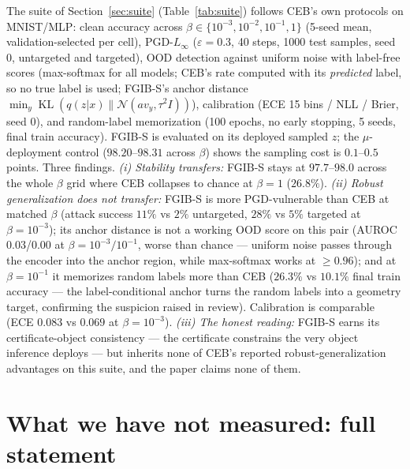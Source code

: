 \documentclass{article} %
\newcommand{\KLd}{\operatorname{KL}}
\newcommand{\Ncal}{\mathcal{N}}
\begin{document}
The suite of Section~\ref{sec:suite} (Table~\ref{tab:suite}) follows CEB's own
protocols on MNIST/MLP: clean accuracy across
$\beta\in\{10^{-3},10^{-2},10^{-1},1\}$ (5-seed mean, validation-selected per cell),
PGD-$L_\infty$ ($\varepsilon{=}0.3$, 40 steps, 1000 test samples, seed 0, untargeted
and targeted), OOD detection against uniform noise with label-free scores
(max-softmax for all models; CEB's rate computed with its \emph{predicted} label, so
no true label is used; FGIB-S's anchor distance
$\min_y \KLd(q(z|x)\|\Ncal(a v_y,\tau^2 I))$), calibration (ECE 15 bins / NLL / Brier,
seed 0), and random-label memorization (100 epochs, no early stopping, 5 seeds, final
train accuracy). FGIB-S is evaluated on its deployed sampled $z$; the
$\mu$-deployment control ($98.20$--$98.31$ across $\beta$) shows the sampling cost is
$0.1$--$0.5$ points. Three findings. \emph{(i) Stability transfers:} FGIB-S stays at
$97.7$--$98.0$ across the whole $\beta$ grid where CEB collapses to chance at
$\beta{=}1$ ($26.8\%$). \emph{(ii) Robust generalization does not transfer:} FGIB-S
is more PGD-vulnerable than CEB at matched $\beta$ (attack success $11\%$ vs $2\%$
untargeted, $28\%$ vs $5\%$ targeted at $\beta{=}10^{-3}$); its anchor distance is
not a working OOD score on this pair (AUROC $0.03$/$0.00$ at $\beta{=}10^{-3}/10^{-1}$,
worse than chance --- uniform noise passes through the encoder into the anchor region,
while max-softmax works at $\ge0.96$); and at $\beta{=}10^{-1}$ it memorizes random
labels more than CEB ($26.3\%$ vs $10.1\%$ final train accuracy --- the
label-conditional anchor turns the random labels into a geometry target, confirming
the suspicion raised in review). Calibration is comparable (ECE $0.083$ vs $0.069$ at
$\beta{=}10^{-3}$). \emph{(iii) The honest reading:} FGIB-S earns its
certificate-object consistency --- the certificate constrains the very object
inference deploys --- but inherits none of CEB's reported robust-generalization
advantages on this suite, and the paper claims none of them.

\section{What we have not measured: full statement}
\label{app:notyet}
\end{document}

